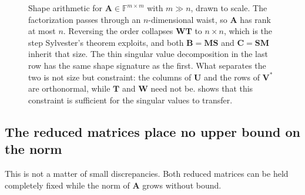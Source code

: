 \documentclass[11pt]{article}
\newcommand{\F}{\mathbb{F}}
\newcommand{\mat}[1]{\mathbf{#1}}
\theoremstyle{definition}
\theoremstyle{remark}
\begin{document}
\begin{figure}[!ht]
  \caption{Shape arithmetic for \(\mat{A}\in\F^{m\times m}\) with \(m\gg n\), drawn to scale. The factorization passes through an \(n\)-dimensional waist, so \(\mat{A}\) has rank at most \(n\). Reversing the order collapses \(\mat{W}\mat{T}\) to \(n\times n\), which is the step Sylvester's theorem exploits, and both \(\mat{B}=\mat{M}\mat{S}\) and \(\mat{C}=\mat{S}\mat{M}\) inherit that size. The thin singular value decomposition in the last row has the same shape signature as the first. What separates the two is not size but constraint: the columns of \(\mat{U}\) and the rows of \(\mat{V}^{*}\) are orthonormal, while \(\mat{T}\) and \(\mat{W}\) need not be.  shows that this constraint is sufficient for the singular values to transfer.}
  \label{fig:shapes}
\end{figure}

\subsection{The reduced matrices place no upper bound on the norm}

This is not a matter of small discrepancies. Both reduced matrices can be held completely fixed while the norm of \(\mat{A}\) grows without bound.
\end{document}
